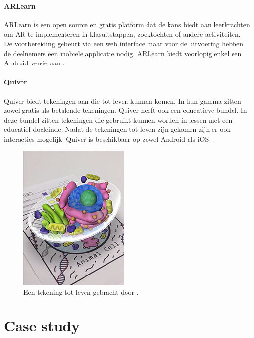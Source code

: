\documentclass[pdftex,a4paper,12pt,twoside]{report}
\begin{document}
\subsubsection{ARLearn}
ARLearn is een open source en gratis platform dat de kans biedt aan leerkrachten om AR te implementeren in klasuitstappen, zoektochten of andere activiteiten. De voorbereiding gebeurt via een web interface maar voor de uitvoering hebben de deelnemers een mobiele applicatie nodig. ARLearn biedt voorlopig enkel een Android versie aan \citep{arlearn}.\\

\subsubsection{Quiver}
Quiver biedt tekeningen aan die tot leven kunnen komen. In hun gamma zitten zowel gratis als betalende tekeningen. Quiver heeft ook een educatieve bundel. In deze bundel zitten tekeningen die gebruikt kunnen worden in lessen met een educatief doeleinde. Nadat de tekeningen tot leven zijn gekomen zijn er ook interacties mogelijk. Quiver is beschikbaar op zowel Android als iOS \citep{quiver}.
\vspace{10pt}
\begin{figure}[!htr]
\begin{center}
\includegraphics[scale=0.85]{quiver}
\caption{Een tekening tot leven gebracht door \cite{quiver}.}
\end{center}
\end{figure}


\chapter{Case study}
\end{document}
